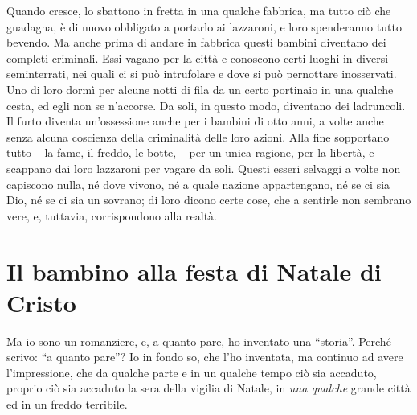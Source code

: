 \documentclass[a4paper, 12pt]{article}
\newcommand{\MyTitle}{\textbf{Il bambino alla festa di Natale di Cristo}}
\begin{document}
\begin{linenumbers}
	Quando cresce, lo sbattono in fretta in una qualche fabbrica, ma tutto ciò che  guadagna, è di nuovo obbligato a portarlo ai lazzaroni, e loro spenderanno tutto bevendo.
	Ma anche prima di andare in fabbrica questi bambini diventano dei completi criminali.
	Essi vagano per la città e conoscono certi luoghi in diversi seminterrati, nei quali ci si può intrufolare e dove si può pernottare inosservati.
	Uno di loro dormì per alcune notti di fila da un certo portinaio in una qualche cesta, ed egli non se n'accorse.
	Da soli, in questo modo, diventano dei ladruncoli.
	Il furto diventa un'ossessione anche per i bambini di otto anni, a volte anche senza alcuna coscienza della criminalità delle loro azioni.
	Alla fine sopportano tutto -- la fame, il freddo, le botte, -- per un unica ragione, per la libertà, e scappano dai loro lazzaroni per vagare da soli.
	Questi esseri selvaggi a volte non capiscono nulla, né dove vivono, né a quale nazione appartengano, né se ci sia Dio, né se ci sia un sovrano;
	di loro dicono certe cose, che a sentirle non sembrano vere, e, tuttavia, corrispondono alla realtà.
	
	\section{\MyTitle}
	
	Ma io sono un romanziere, e, a quanto pare, ho inventato una ``storia''.
	Perché scrivo: ``a quanto pare''? Io in fondo so, che l'ho inventata, ma continuo ad avere l'impressione, che da qualche parte e in un qualche tempo ciò sia accaduto, proprio ciò sia accaduto la sera della vigilia di Natale, in \textit{una qualche} grande città ed in un freddo terribile.
	
	\vspace{1em}
	

\end{linenumbers}
\end{document}
